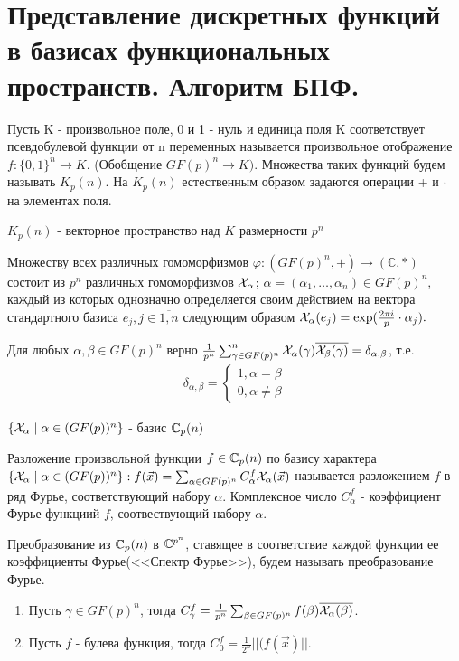\section {Представление дискретных функций в базисах функциональных пространств. Алгоритм БПФ. }

\opr Пусть K - произвольное поле, 0 и 1 - нуль и единица поля K  соответствует псевдобулевой функции от n переменных называется произвольное отображение $f:\{0,1\}^{n} \longrightarrow K$.
(Обобщение $ GF(p)^n \longrightarrow K)$.
Множества таких функций будем называть $K_p(n)$. На $K_p(n)$ естественным образом задаются операции + и $\cdot$ на элементах поля.

\utv $K_p(n)$ - векторное пространство над $K$ размерности $p^n$

\thr Множеству всех различных гомоморфизмов $\varphi: (GF(p)^n,+) \longrightarrow (\mathbb{C},*)$ состоит из $p^n$ различных гомоморфизмов $\mathcal{X}_\alpha$; $\alpha = (\alpha_1,\dots, \alpha_n) \in GF(p)^n$, каждый из которых однозначно определяется своим действием на вектора стандартного базиса $e_j, j \in \overline{1, n}$
следующим образом $\mathcal{X}_\alpha(e_j) = \exp(\frac{2\pi i}{p}\cdot \alpha_j).$

\utv Для любых $\alpha,\beta \in GF(p)^n$ верно $\frac{1}{p^n}\sum_{\gamma \in GF(p)^n}^n \mathcal{X}_\alpha (\gamma) \overline {\mathcal{X}_\beta (\gamma )} = \delta_{\alpha,\beta}$, т.е.
\begin{align*}
    \delta_{\alpha, \beta} = 
    \begin{cases}
        1, \alpha = \beta \\
        0, \alpha \neq \beta
    \end{cases}
\end{align*}

\thr $\{ \mathcal{X}_\alpha \mid \alpha \in (GF(p))^n \}$ - базис $\mathbb{C}_p(n)$

\opr Разложение произвольной функции $f \in \mathbb{C}_p(n)$ по базису характера $\{ \mathcal{X}_\alpha \mid \alpha \in (GF(p))^n \}: f(\vec{x}) =  \sum_{\alpha \in GF(p)^n} C_\alpha^f \mathcal{X}_\alpha(\vec{x})$ называется разложением $f$ в ряд Фурье, соответствующий набору $\alpha$. Комплексное число $C_\alpha^f$ - коэффициент Фурье функциий $f$,
соотвествующий набору $\alpha$.

\opr Преобразование из $\mathbb{C}_p(n)$ в $\mathbb{C}^{p^n}$, ставящее в соответствие каждой функции ее коэффициенты Фурье(<<Спектр Фурье>>), будем называть преобразование Фурье.

\utv
\begin{enumerate}
    \item Пусть $\gamma \in GF(p)^n$, тогда $C_\gamma^f = \frac{1}{p^n}\sum_{\beta \in GF(p)^n} f(\beta) \overline{\mathcal{X}_\alpha(\beta)}$.
    \item Пусть $f$ - булева функция, тогда $C_0^f = \frac{1}{2^n}||(f(\vec{x})||$.
\end{enumerate}

